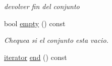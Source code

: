 \begin{DoxyCompactItemize}
\begin{DoxyCompactList}\small\item\em devolver fin del conjunto \end{DoxyCompactList}\item 
bool \hyperlink{classconjunto_afcf4ff3ff3c1f83b63e901efebe93533}{empty} () const 
\begin{DoxyCompactList}\small\item\em Chequea si el conjunto esta vacio. \end{DoxyCompactList}\item 
\hypertarget{classconjunto_afaee64c1f0f6087a0ae17ab6741a0723}{}\hyperlink{classconjunto_1_1iterator}{iterator} \hyperlink{classconjunto_afaee64c1f0f6087a0ae17ab6741a0723}{end} () const \label{classconjunto_afaee64c1f0f6087a0ae17ab6741a0723}


\end{DoxyCompactItemize}
